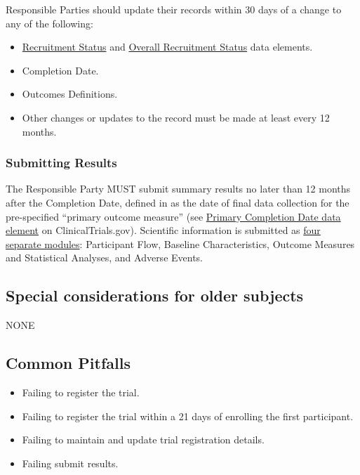 \documentclass[]{book}
\providecommand{\tightlist}{%
  \setlength{\itemsep}{0pt}\setlength{\parskip}{0pt}}
\theoremstyle{definition}
\theoremstyle{definition}
\theoremstyle{definition}
\theoremstyle{remark}
\begin{document}
Responsible Parties should update their records within 30 days of a
change to any of the following:

\begin{itemize}
\tightlist
\item
  \href{http://prsinfo.clinicaltrials.gov/definitions.html\#FacilityStatus}{Recruitment
  Status} and
  \href{http://prsinfo.clinicaltrials.gov/definitions.html\#OverallStatus}{Overall
  Recruitment Status} data elements.
\item
  Completion Date.
\item
  Outcomes Definitions.
\item
  Other changes or updates to the record must be made at least every 12
  months.
\end{itemize}

\subsubsection{Submitting Results}\label{submitting-results}

The Responsible Party MUST submit summary results no later than 12
months after the Completion Date, defined in as the date of final data
collection for the pre-specified ``primary outcome measure'' (see
\href{http://prsinfo.clinicaltrials.gov/definitions.html\#PrimaryCompletionDate}{Primary
Completion Date data element} on ClinicalTrials.gov). Scientific
information is submitted as
\href{https://clinicaltrials.gov/ct2/manage-recs/how-report\#Overview}{four
separate modules}: Participant Flow, Baseline Characteristics, Outcome
Measures and Statistical Analyses, and Adverse Events.

\subsection{Special considerations for older
subjects}\label{special-considerations-for-older-subjects-3}

NONE

\subsection{Common Pitfalls}\label{common-pitfalls-6}

\begin{itemize}
\tightlist
\item
  Failing to register the trial.
\item
  Failing to register the trial within a 21 days of enrolling the first
  participant.
\item
  Failing to maintain and update trial registration details.
\item
  Failing submit results.
\end{itemize}
\end{document}
